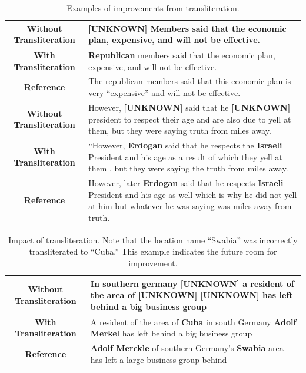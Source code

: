 \documentclass[logo]{pbml}
\begin{document}
\begin{table}
\begin{center}
\begin{tabular}{|c|p{8cm}|}
\hline
\small \textbf{Without Transliteration} & \small \textbf{[UNKNOWN]} Members said that the economic plan, expensive, and will not be effective. \\ \hline
\small \textbf{With Transliteration} & \small \textbf{Republican} members said that the economic plan, expensive, and will not be effective.  \\ \hline
\small \textbf{Reference} & \small The republican members said that this economic plan is very ``expensive'' and will not be effective. \\ \hline
\small \textbf{Without Transliteration} & However, \small \textbf{[UNKNOWN]} said that he \small \textbf{[UNKNOWN]} president to respect their age and are also due to yell at them, but they were saying truth from miles away.  \\ \hline
\small \textbf{With Transliteration} & ``However, \small \textbf{Erdogan} said that he respects the \small \textbf{Israeli} President and his age as a result of which they yell at them , but they were saying the truth from miles away.  \\ \hline
\small \textbf{Reference} & However, later \small \textbf{Erdogan} said that he respects \small \textbf{Israeli} President and his age as well which is why he did not yell at him but whatever he was saying was miles away from truth.   \\ \hline
\end{tabular}
\end{center}
\normalsize
\caption{\label{transliteration-impact-example1} Examples of improvements from transliteration.}
\end{table}


\begin{table}
\begin{center}
\begin{tabular}{|c|p{8cm}|}
\hline
\small \textbf{Without Transliteration} & In southern germany \small \textbf{[UNKNOWN]} a resident of the area of \small \textbf{[UNKNOWN]} \small \textbf{[UNKNOWN]} has left behind a big business group  \\ \hline
\small \textbf{With Transliteration} & A resident of the area of \small \textbf{Cuba} in south Germany \small \textbf{Adolf Merkel} has left behind a big business group  \\ \hline
\small \textbf{Reference} & \small \textbf{Adolf Merckle} of southern Germany's \small \textbf{Swabia} area has left a large business group behind  \\ \hline
\end{tabular}
\end{center}
\normalsize
\caption{\label{transliteration-impact-example2} Impact of transliteration. Note that the location name ``Swabia'' was incorrectly transliterated to ``Cuba.'' This example indicates the future room for improvement.}
\end{table}
\end{document}

